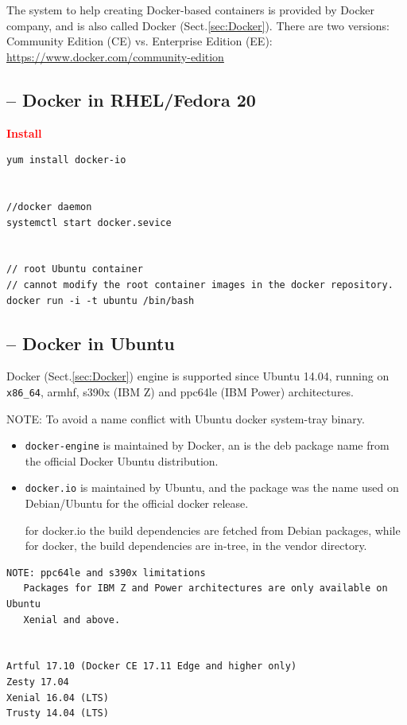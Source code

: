 The system to help creating Docker-based containers is
provided by Docker company, and is also called Docker (Sect.\ref{sec:Docker}).
There are two versions: Community Edition (CE) vs. Enterprise Edition (EE):
\url{https://www.docker.com/community-edition}


\subsection{-- Docker in RHEL/Fedora 20}


\textcolor{red}{\bf Install}
\begin{verbatim}
yum install docker-io


//docker daemon
systemctl start docker.sevice


// root Ubuntu container
// cannot modify the root container images in the docker repository.
docker run -i -t ubuntu /bin/bash
\end{verbatim}

\subsection{-- Docker in Ubuntu}
\label{sec:Docker-for-Ubuntu}

Docker (Sect.\ref{sec:Docker}) engine is supported since Ubuntu 14.04, running
on \verb!x86_64!, armhf, s390x (IBM Z) and ppc64le (IBM Power) architectures.

NOTE: To avoid a name conflict with Ubuntu docker system-tray binary.

\begin{itemize}
  
  \item \verb!docker-engine! is maintained by Docker, an is the deb package name
  from the official Docker Ubuntu distribution.
  
  
  \item \verb!docker.io! is maintained by Ubuntu, and the package was the name
  used on Debian/Ubuntu for the official docker release.
  
  for docker.io the build dependencies are fetched from Debian packages, while
  for docker, the build dependencies are in-tree, in the vendor directory.
  
\end{itemize}

\begin{verbatim}
NOTE: ppc64le and s390x limitations
   Packages for IBM Z and Power architectures are only available on Ubuntu
   Xenial and above.


Artful 17.10 (Docker CE 17.11 Edge and higher only)
Zesty 17.04
Xenial 16.04 (LTS)
Trusty 14.04 (LTS)
\end{verbatim}

